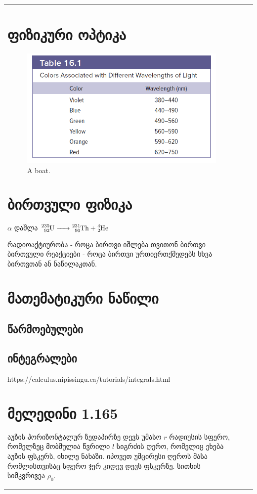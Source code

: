 \documentclass{book}
\begin{document}
\begin{tabular}{|l|c|c|}
\chapter{ფიზიკური ოპტიკა}
	\begin{figure}[H]
    	\includegraphics[width=0.8\columnwidth]{figures/yyyu}
    \caption{A boat.}
    \end{figure}

	

\chapter{ბირთვული ფიზიკა}
$\alpha$ დაშლა $\ce{^235_92U -> ^231_90Th + ^4_2He}$

რადიოაქტიურობა - როცა ბირთვი იშლება თვითონ ბირთვი
ბირთვული რეაქციები - როცა ბირთვი ურთიერთქმედებს სხვა ბირთვთან ან ნაწილაკთან.

\chapter{მათემატიკური ნაწილი}
\section{წარმოებულები}
\section{ინტეგრალები}
https://calculus.nipissingu.ca/tutorials/integrals.html

\chapter{მელედინი 1.165} აუზის პორიზონტალურ ზედაპირზე დევს უმასო $r$ რადიუსის სფერო, რომელზეც მობმულია წვრილი $l$ სიგრძის ღერო, რომელიც ეხება აუზის ფსკერს, იხილე ნახაზი. იპოვეთ უმცირესი ღეროს მასა რომლისთვისაც სფერო ჯერ კიდევ დევს ფსკერზე. სითხის სიმკვრივეა $\rho_0$. 



\end{tabular}
\end{document}
